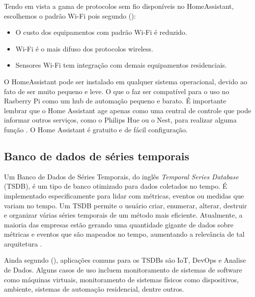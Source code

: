 
Tendo em vista a gama de protocolos sem fio disponíveis no HomeAssistant, escolhemos o padrão Wi-Fi pois segundo \citeauthor{Lundrigan2017} (\citeyear{Lundrigan2017}):

\begin{itemize}
	\item O custo dos equipamentos com padrão Wi-Fi é reduzido.
	\item Wi-Fi é o mais difuso dos protocolos wireless.
	\item Sensores Wi-Fi tem integração com demais equipamentos residenciais.
\end{itemize}

O HomeAssistant pode ser instalado em qualquer sistema operacional, devido ao fato de ser muito pequeno e leve. O que o faz ser compatível para o uso no Rasberry Pi como um hub de automação pequeno e barato. É importante lembrar que o Home Assistant age apenas como uma central de controle que pode informar outros serviços, como o Philips Hue ou o Nest, para realizar alguma função \cite{AlmeidaCosta}. O Home Assistant é gratuito e de fácil configuração.

\subsection{Banco de dados de séries temporais}

Um Banco de Dados de Séries Temporais, do inglês \textit{Temporal Series Database} (TSDB), é um tipo de banco otimizado para dados coletados no tempo. É implementado especificamente para lidar com métricas, eventos ou medidas que variam no tempo. Um TSDB permite o usuário criar, enumerar, alterar, destruir e organizar várias séries temporais de um método mais eficiente. Atualmente, a maioria das empresas estão gerando uma quantidade gigante de dados sobre métricas e eventos que são mapeados no tempo, aumentando a relevância de tal arquitetura \cite{Noor2017}.

Ainda segundo \citeauthor{Noor2017} (\citeyear{Noor2017}), aplicações comuns para os TSDBs são IoT, DevOps e Analise de Dados. Alguns casos de uso incluem monitoramento de sistemas de software como máquinas virtuais, monitoramento de sistemas físicos como dispositivos, ambiente, sistemas de automação residencial, dentre outros.

